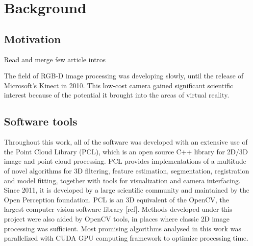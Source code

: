 \chapter{Background}
\label{cha:background}




\section{Motivation}
\label{sec:motivation}

Read and merge few article intros


The field of RGB-D image processing was developing slowly, until the release of Microsoft's Kinect in 2010. This low-cost camera gained significant scientific interest because of the potential it brought into the areas of virtual reality.




\section{Software tools}
\label{sec:software}

Throughout this work, all of the software was developed with an extensive use of the Point Cloud Library (PCL)\cite{Rusu_ICRA2011_PCL}, which is an open source C++ library for 2D/3D image and point cloud processing. PCL provides implementations of  a multitude of novel algorithms for 3D filtering, feature estimation, segmentation, registration and model fitting, together with tools for visualization and camera interfacing. Since 2011, it is developed by a large scientific community and maintained by the Open Perception foundation. PCL is an 3D equivalent of the OpenCV, the largest computer vision software library [ref]. Methods developed under this project were also aided by OpenCV tools, in places where classic 2D image processing was sufficient.
Most promising algorithms analysed in this work was parallelized with CUDA GPU  computing framework to optimize processing time.






